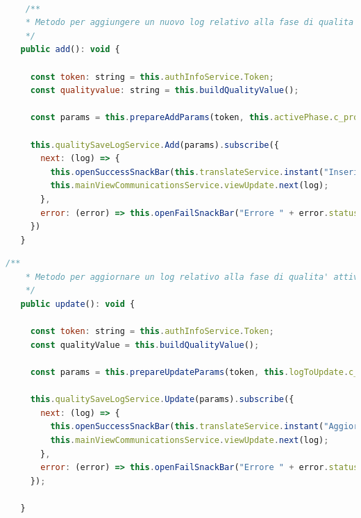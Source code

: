 \begin{lstlisting}[language=JavaScript, caption={Aggiunta di dati di controllo qualità}]

    /**
    * Metodo per aggiungere un nuovo log relativo alla fase di qualita' attiva
    */
   public add(): void {
 
     const token: string = this.authInfoService.Token;
     const qualityvalue: string = this.buildQualityValue();
 
     const params = this.prepareAddParams(token, this.activePhase.c_projectphase_id!, qualityvalue)
 
     this.qualitySaveLogService.Add(params).subscribe({
       next: (log) => {
         this.openSuccessSnackBar(this.translateService.instant("Inserimento avvenuto correttamente!"), "X");
         this.mainViewCommunicationsService.viewUpdate.next(log);
       },
       error: (error) => this.openFailSnackBar("Errore " + error.status + " - " + error.error.description, "X")
     })
   }
\end{lstlisting}

\begin{lstlisting}[language=JavaScript, caption={Modifica di dati di controllo qualità}]
    /**
    * Metodo per aggiornare un log relativo alla fase di qualita' attiva
    */
   public update(): void {
 
     const token: string = this.authInfoService.Token;
     const qualityValue = this.buildQualityValue();
 
     const params = this.prepareUpdateParams(token, this.logToUpdate.c_projectphase_quality_log_id!, qualityValue);
 
     this.qualitySaveLogService.Update(params).subscribe({
       next: (log) => {
         this.openSuccessSnackBar(this.translateService.instant("Aggiornamento avvenuto correttamente!"), "X")
         this.mainViewCommunicationsService.viewUpdate.next(log);
       },
       error: (error) => this.openFailSnackBar("Errore " + error.status + " - " + error.error.description, "X")
     });
 
   }

\end{lstlisting}



